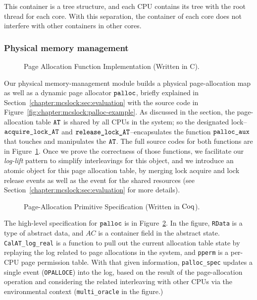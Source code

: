 This container is a tree structure, and each CPU contains its tree with the root thread for each core. 
With this separation, the container of each core does not interfere with other containers in other cores. 

\subsubsection{Physical memory management} 
\begin{figure}
 
\caption{Page Allocation Function Implementation (Written in C).}
\label{fig:chapter:certikos:palloc-in-c}
\end{figure}
Our physical memory-management module builds a physical page-allocation map as well as a dynamic page allocator ${\mathrm{\texttt{palloc}}}$, briefly explained 
in Section~\ref{chapter:mcslock:sec:evaluation} with the source code in Figure~\ref{fig:chapter:mcslock:palloc-example}.
As discussed in the section, the page-allocation table ${\mathrm{\texttt{AT}}}$ is shared by 
all CPUs in the system; so
the designated lock--${\mathrm{\texttt{acquire\_lock\_AT}}}$ and  ${\mathrm{\texttt{release\_lock\_AT}}}$--encapsulates the function ${\mathrm{\texttt{palloc\_aux}}}$ that touches and manipulates the ${\mathrm{\texttt{AT}}}$.
The full source codes for both functions are in Figure~\ref{fig:chapter:certikos:palloc-in-c}.
Once we prove  the correctness of those functions, we facilitate 
our \textit{log-lift} pattern to simplify  interleavings for this object,
and we introduce 
an atomic object for this page allocation table, by merging  lock acquire and lock release events as well as 
the event for the shared resources  (see Section~\ref{chapter:mcslock:sec:evaluation} for more details).
\begin{figure}
 
\caption{Page-Allocation Primitive Specification (Written in $\mathrm{Coq}$).}
\label{fig:chapter:certikos:palloc-in-coq}
\end{figure}
The high-level specification for ${\mathrm{\texttt{palloc}}}$ is in Figure~\ref{fig:chapter:certikos:palloc-in-coq}.
In the figure, \lstinline$RData$ is a type of abstract data, and $AC$ is a container field in the abstract state.
\lstinline$CalAT_log_real$ is a function to pull out the current allocation table state by replaying the log
related to page allocations in the system, and \lstinline$pperm$ is a per-CPU page permission table. 
With that given information, \lstinline$palloc_spec$ updates a single event (\lstinline$OPALLOCE$) into the log, based on the result of the page-allocation operation and considering the related interleaving with other CPUs via the environmental context (\lstinline$multi_oracle$ in the figure.)

